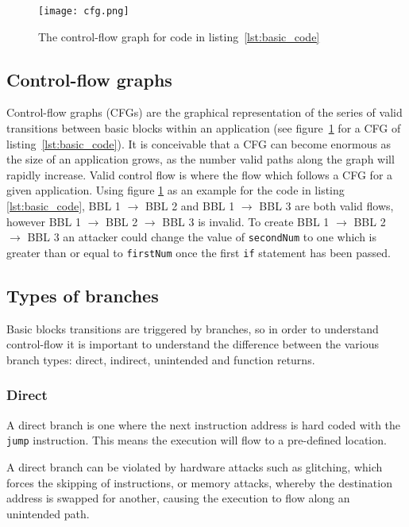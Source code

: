 \begin{figure}
  \centering
  \vspace*{0.5in}
  \texttt{[image: cfg.png]}
  \caption{The control-flow graph for code in listing~\ref{lst:basic_code}}
  \label{fig:basicCFG}
\end{figure}

\subsection{Control-flow graphs}
Control-flow graphs (CFGs) are the graphical representation of the series of valid transitions between basic blocks within an application (see figure~\ref{fig:basicCFG} for a CFG of listing~\ref{lst:basic_code}). It is conceivable that a CFG can become enormous as the size of an application grows, as the number valid paths along the graph will rapidly increase. Valid control flow is where the flow which follows a CFG for a given application. Using figure \ref{fig:basicCFG} as an example for the code in listing \ref{lst:basic_code}, BBL 1 $\rightarrow$ BBL 2 and BBL 1 $\rightarrow$ BBL 3 are both valid flows, however BBL 1 $\rightarrow$ BBL 2 $\rightarrow$ BBL 3 is invalid. To create BBL 1 $\rightarrow$ BBL 2 $\rightarrow$ BBL 3 an attacker could change the value of \verb|secondNum| to one which is greater than or equal to \verb|firstNum| once the first \verb|if| statement has been passed. 

\subsection{Types of branches}
Basic blocks transitions are triggered by branches, so in order to understand control-flow it is important to understand the difference between the various branch types: direct, indirect, unintended and function returns.

\subsubsection*{Direct}
A direct branch is one where the next instruction address is hard coded with the \verb|jump| instruction. This means the execution will flow to a pre-defined location.

A direct branch can be violated by hardware attacks such as glitching, which forces the skipping of instructions, or memory attacks, whereby the destination address is swapped for another, causing the execution to flow along an unintended path.

